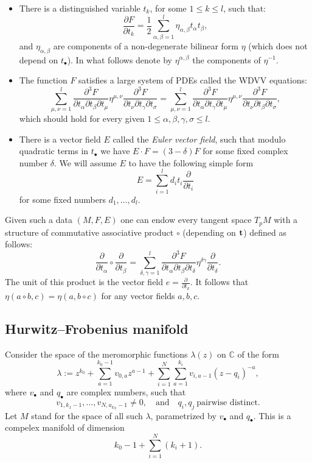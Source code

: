 \documentclass[12pt,a4paper]{amsart}
\newcommand{\CC}{{\mathbb{C}}}
\newcommand{\p}{{\partial}}
\newcommand{\<}{\left<}
\renewcommand{\>}{\right>}
\newcommand{\bt}{{\bf t}}
\numberwithin{equation}{section}
\begin{document}
\begin{itemize}
	\item 
There is a distinguished variable $t_k$, for some $1 \le k \le l$, such that:
\[
    \frac{\p F}{\p t_k} = \frac{1}{2} \sum_{\alpha,\beta = 1}^l \eta_{\alpha,\beta} t_\alpha t_\beta,
\]
and $\eta_{\alpha,\beta}$ are components of a non-degenerate bilinear form $\eta$ (which does not depend on $t_\bullet$). In what follows denote by $\eta^{\alpha,\beta}$ the components of $\eta^{-1}$.

\item The function $F$ satisfies a large system of PDEs called the WDVV equations:
\[
\sum_{\mu,\nu = 1}^l \frac{\p^3 F}{\p t_\alpha \p t_\beta \p t_\mu} \eta^{\mu,\nu} \frac{\p^3 F}{\p t_\nu \p t_\gamma \p t_\sigma}
=
\sum_{\mu,\nu = 1}^l \frac{\p^3 F}{\p t_\alpha \p t_\gamma \p t_\mu} \eta^{\mu,\nu} \frac{\p^3 F}{\p t_\nu \p t_\beta \p t_\sigma},
\]
which should hold for every given $1\leq\alpha,\beta,\gamma,\sigma\leq l$.

\item There is a vector field $E$ called the \textit{Euler vector field}, such that modulo quadratic terms in $t_\bullet$ we have $E \cdot F = (3-\delta) F$ for some fixed complex number $\delta$. We will assume $E$ to have the following simple form
\[
    E = \sum_{i=1}^l d_i t_i \frac{\p}{\p t_i}
\]
for some fixed numbers $d_1,\dots,d_l$. 
\end{itemize}

Given such a data $(M,F,E)$ one can endow every tangent space $T_pM$ with a structure of commutative associative product $\circ$ (depending on $\bt$) defined as follows:
\[
    \frac{\p}{\p t_\alpha} \circ \frac{\p}{\p t_\beta} = \sum_{\delta,\gamma=1}^l\frac{\p^3 F}{\p t_\alpha \p t_\beta \p t_\delta} \eta^{\delta\gamma} \frac{\p}{\p t_\delta}.
\]
The unit of this product is the vector field $e = \frac{\p}{\p t_k}$.
It follows that $\eta(a \circ b,c) = \eta(a,b \circ c)$ for any vector fields $a,b,c$.

\subsection{Hurwitz--Frobenius manifold}
Consider the space of the meromorphic functions $\lambda(z)$ on $\CC$ of the form
\begin{equation*}
 \lambda := z^{k_0} + \sum _{a=1}^{k_0-1} v_{0,a} z^{a-1} + \sum _{i=1}^N \sum _{a=1}^{k_i} v_{i,a-1} \left(z-q_i\right)^{-a},
\end{equation*}
where $v_\bullet$ and $q_\bullet$ are complex numbers, such that
\[
    v_{1,k_1-1},\dots, v_{N,a_{k_N}-1} \neq 0, \quad \text{and} \quad q_{i},q_{j} \ \text{pairwise distinct}.
\]
Let $M$ stand for the space of all such $\lambda$, parametrized by $v_\bullet$ and $q_\bullet$. This is a compelex manifold of dimension
\[
    k_0-1 + \sum_{i=1}^N (k_i+1).
\]
\end{document}
